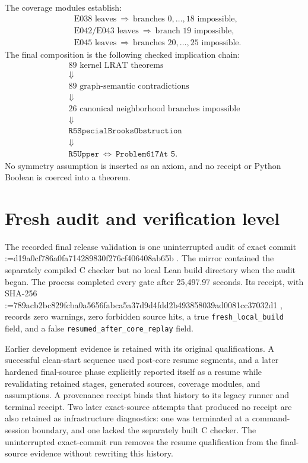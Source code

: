 \documentclass[11pt,reqno,a4paper]{amsart}
\makeatletter
\theoremstyle{definition}
\theoremstyle{remark}
\newcommand{\sha}[1]{%
  \begingroup\ttfamily\small
  \@tfor\@tempa:=#1\do{\@tempa\hspace{0pt}}%
  \endgroup}
\newcommand{\code}[1]{\texttt{#1}}
\makeatother
\begin{document}
The coverage modules establish:
\begin{align*}
 &\text{E038 leaves}\ \Longrightarrow\ \text{branches }0,\ldots,18
   \text{ impossible},\\
 &\text{E042/E043 leaves}\ \Longrightarrow\ \text{branch }19
   \text{ impossible},\\
 &\text{E045 leaves}\ \Longrightarrow\ \text{branches }20,\ldots,25
   \text{ impossible}.
\end{align*}
The final composition is the following checked implication chain:
\[
\begin{array}{c}
\text{89 kernel LRAT theorems}\\
\Downarrow\\
\text{89 graph-semantic contradictions}\\
\Downarrow\\
\text{26 canonical neighborhood branches impossible}\\
\Downarrow\\
\code{R5SpecialBrooksObstruction}\\
\Downarrow\\
\code{R5Upper}\ \Longleftrightarrow\ \code{Problem617At 5}.
\end{array}
\]
No symmetry assumption is inserted as an axiom, and no receipt or Python
Boolean is coerced into a theorem.

\section{Fresh audit and verification level}\label{sec:audit}

The recorded final release validation is one uninterrupted audit of exact
commit
\sha{d19a0cf786a0fa714289830f276cf406408ab65b}.  The mirror contained the
separately compiled C checker but no local Lean build directory when the
audit began.  The process completed every gate after 25,497.97 seconds.  Its
receipt, with SHA-256
\sha{789acb2bc829fcba0a5656fabca5a37d9d4fdd2b493858039ad0081cc37032d1},
records zero warnings, zero forbidden source hits, a true
\code{fresh\_local\_build} field, and a false
\code{resumed\_after\_core\_replay} field.

Earlier development evidence is retained with its original
qualifications.  A successful clean-start sequence used post-core resume
segments, and a later hardened final-source phase explicitly reported itself
as a resume while revalidating retained stages, generated sources, coverage
modules, and assumptions.  A provenance receipt binds that history to its
legacy runner and terminal receipt.  Two later exact-source attempts that
produced no receipt are also retained as infrastructure diagnostics: one was
terminated at a command-session boundary, and one lacked the separately built
C checker.  The uninterrupted exact-commit run removes the resume
qualification from the final-source evidence without rewriting this history.
\end{document}
